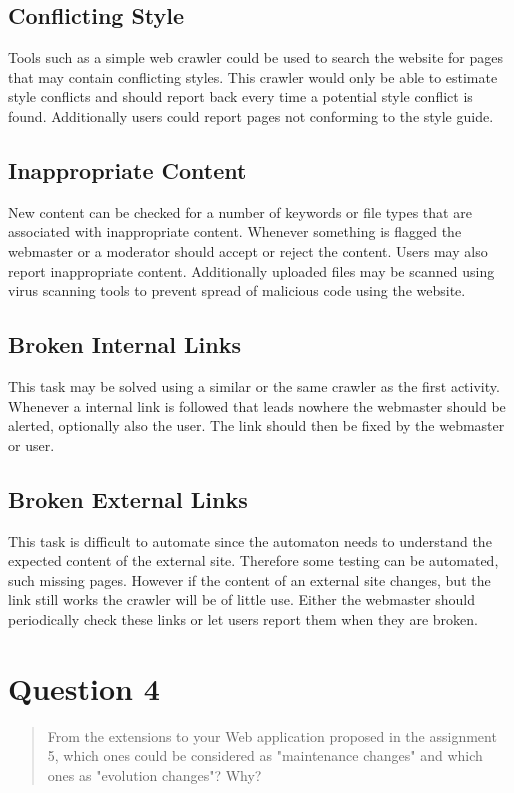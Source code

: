 \documentclass[10pt,a4paper]{report}
\begin{document}
\subsection{Conflicting Style}
Tools such as a simple web crawler could be used to search the website for pages that may contain conflicting styles. This crawler would only be able to estimate style conflicts and should report back every time a potential style conflict is found. Additionally users could report pages not conforming to the style guide.

\subsection{Inappropriate Content}
New content can be checked for a number of keywords or file types that are associated with inappropriate content. Whenever something is flagged the webmaster or a moderator should accept or reject the content. Users may also report inappropriate content. Additionally uploaded files may be scanned using virus scanning tools to prevent spread of malicious code using the website.

\subsection{Broken Internal Links}
This task may be solved using a similar or the same crawler as the first activity. Whenever a internal link is followed that leads nowhere the webmaster should be alerted, optionally also the user. The link should then be fixed by the webmaster or user.

\subsection{Broken External Links}
This task is difficult to automate since the automaton needs to understand the expected content of the external site. Therefore some testing can be automated, such missing pages. However if the content of an external site changes, but the link still works the crawler will be of little use. Either the webmaster should periodically check these links or let users report them when they are broken.

\section{Question 4}
\begin{quote}
From the extensions to your Web application proposed in the assignment 5, which ones could be considered as "maintenance changes" and which ones as "evolution changes"? Why?
\end{quote}
\end{document}
